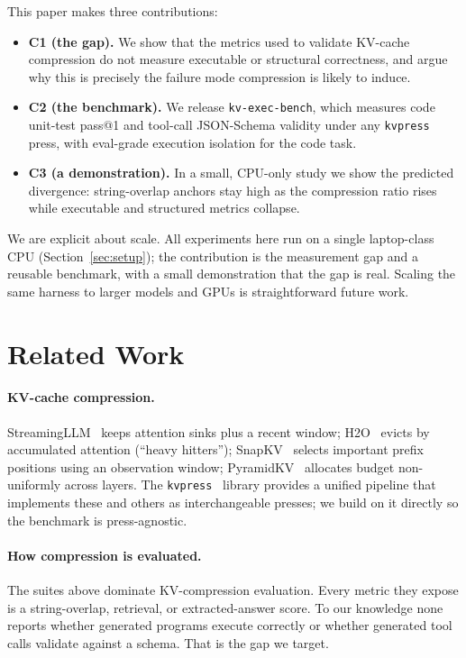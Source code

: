 \documentclass[11pt]{article}
\begin{document}
This paper makes three contributions:
\begin{itemize}
  \item \textbf{C1 (the gap).} We show that the metrics used to validate KV-cache compression do not
  measure executable or structural correctness, and argue why this is precisely the failure mode
  compression is likely to induce.
  \item \textbf{C2 (the benchmark).} We release \texttt{kv-exec-bench}, which measures code unit-test
  pass@1 and tool-call JSON-Schema validity under any \texttt{kvpress}~\cite{nvidia2024kvpress} press,
  with eval-grade execution isolation for the code task.
  \item \textbf{C3 (a demonstration).} In a small, CPU-only study we show the predicted divergence:
  string-overlap anchors stay high as the compression ratio rises while executable and structured
  metrics collapse.
\end{itemize}

We are explicit about scale. All experiments here run on a single laptop-class CPU
(Section~\ref{sec:setup}); the contribution is the measurement gap and a reusable benchmark, with a
small demonstration that the gap is real. Scaling the same harness to larger models and GPUs is
straightforward future work.

\section{Related Work}
\label{sec:related}

\paragraph{KV-cache compression.} StreamingLLM~\cite{xiao2024streamingllm} keeps attention sinks plus
a recent window; H2O~\cite{zhang2023h2o} evicts by accumulated attention (``heavy hitters'');
SnapKV~\cite{li2024snapkv} selects important prefix positions using an observation window;
PyramidKV~\cite{cai2024pyramidkv} allocates budget non-uniformly across layers. The
\texttt{kvpress}~\cite{nvidia2024kvpress} library provides a unified pipeline that implements these
and others as interchangeable presses; we build on it directly so the benchmark is press-agnostic.

\paragraph{How compression is evaluated.} The suites above
\cite{hsieh2024ruler,bai2024longbench,zhang2024inftybench,kamradt2023niah} dominate KV-compression
evaluation. Every metric they expose is a string-overlap, retrieval, or extracted-answer score. To
our knowledge none reports whether generated programs execute correctly or whether generated tool
calls validate against a schema. That is the gap we target.
\end{document}
